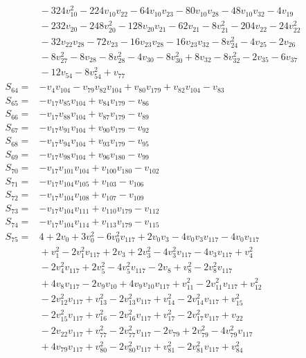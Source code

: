 \begin{align*}
&{}-324v_{10}^{2}-224v_{10}v_{22}-64v_{10}v_{23}-80v_{10}v_{28}-48v_{10}v_{32}-4v_{19}\\
&{}-232v_{20}-248v_{20}^{2}-128v_{20}v_{21}-62v_{21}-8v_{21}^{2}-204v_{22}-24v_{22}^{2}\\
&{}-32v_{22}v_{28}-72v_{23}-16v_{23}v_{28}-16v_{23}v_{32}-8v_{24}^{2}-4v_{25}-2v_{26}\\
&{}-8v_{27}^{2}-8v_{28}-8v_{28}^{2}-4v_{30}-8v_{30}^{2}+8v_{32}-8v_{32}^{2}-2v_{35}-6v_{37}\\
&{}-12v_{54}-8v_{54}^{2}+v_{77}\\
S_{64}={}&-v_{4}v_{104}-v_{79}v_{82}v_{104}+v_{80}v_{179}+v_{82}v_{104}-v_{83}\\
S_{65}={}&-v_{17}v_{85}v_{104}+v_{84}v_{179}-v_{86}\\
S_{66}={}&-v_{17}v_{88}v_{104}+v_{87}v_{179}-v_{89}\\
S_{67}={}&-v_{17}v_{91}v_{104}+v_{90}v_{179}-v_{92}\\
S_{68}={}&-v_{17}v_{94}v_{104}+v_{93}v_{179}-v_{95}\\
S_{69}={}&-v_{17}v_{98}v_{104}+v_{96}v_{180}-v_{99}\\
S_{70}={}&-v_{17}v_{101}v_{104}+v_{100}v_{180}-v_{102}\\
S_{71}={}&-v_{17}v_{104}v_{105}+v_{103}-v_{106}\\
S_{72}={}&-v_{17}v_{104}v_{108}+v_{107}-v_{109}\\
S_{73}={}&-v_{17}v_{104}v_{111}+v_{110}v_{179}-v_{112}\\
S_{74}={}&-v_{17}v_{104}v_{114}+v_{113}v_{179}-v_{115}\\
S_{75}={}&4+2v_{0}+3v_{0}^{2}-6v_{0}^{2}v_{117}+2v_{0}v_{3}-4v_{0}v_{3}v_{117}-4v_{0}v_{117}\\
&{}+v_{1}^{2}-2v_{1}^{2}v_{117}+2v_{3}+2v_{3}^{2}-4v_{3}^{2}v_{117}-4v_{3}v_{117}+v_{4}^{2}\\
&{}-2v_{4}^{2}v_{117}+2v_{5}^{2}-4v_{5}^{2}v_{117}-2v_{8}+v_{8}^{2}-2v_{8}^{2}v_{117}\\
&{}+4v_{8}v_{117}-2v_{9}v_{10}+4v_{9}v_{10}v_{117}+v_{11}^{2}-2v_{11}^{2}v_{117}+v_{12}^{2}\\
&{}-2v_{12}^{2}v_{117}+v_{13}^{2}-2v_{13}^{2}v_{117}+v_{14}^{2}-2v_{14}^{2}v_{117}+v_{15}^{2}\\
&{}-2v_{15}^{2}v_{117}+v_{16}^{2}-2v_{16}^{2}v_{117}+v_{17}^{2}-2v_{17}^{2}v_{117}+v_{22}\\
&{}-2v_{22}v_{117}+v_{77}^{2}-2v_{77}^{2}v_{117}-2v_{79}+2v_{79}^{2}-4v_{79}^{2}v_{117}\\
&{}+4v_{79}v_{117}+v_{80}^{2}-2v_{80}^{2}v_{117}+v_{81}^{2}-2v_{81}^{2}v_{117}+v_{84}^{2}\\

\end{align*}
